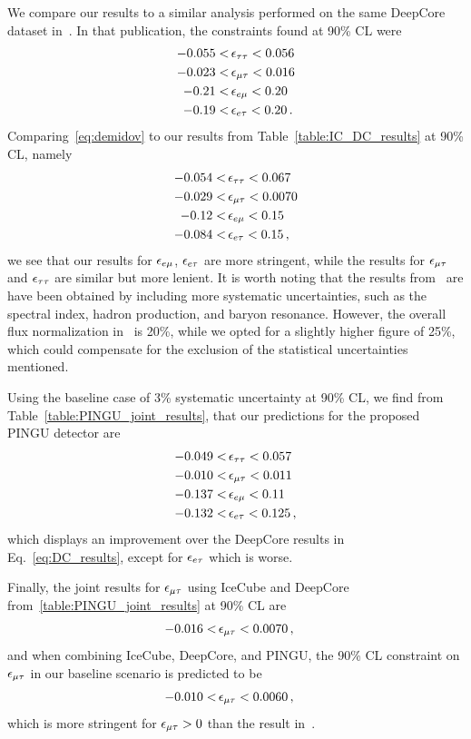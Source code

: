 {{We compare our results to a similar analysis performed on the same DeepCore dataset in~\cite{demidov}. In that publication, 
the constraints found at 90\% CL were 
\begin{align}\label{eq:demidov}
   -0.055 <&\, \epsilon_{\tau\tau} < 0.056 \nonumber \\
   -0.023 <&\, \epsilon_{\mu\tau} < 0.016 \nonumber \\
   -0.21 <&\, \epsilon_{e\mu} < 0.20 \nonumber \\
   -0.19 <&\, \epsilon_{e\tau} < 0.20\,.
\end{align}
Comparing~\ref{eq:demidov} to our results from Table~\ref{table:IC_DC_results} at 90\% CL, namely
\begin{align}\label{eq:DC_results}
   -0.054 <&\, \epsilon_{\tau\tau} < 0.067 \nonumber \\
   -0.029 <&\, \epsilon_{\mu\tau} < 0.0070 \nonumber \\
   -0.12 <&\, \epsilon_{e\mu} < 0.15 \nonumber \\
   -0.084 <&\, \epsilon_{e\tau} < 0.15\,,
\end{align}
we see that our results for $\epsilon_{e\mu}$, $\epsilon_{e\tau}$ are more stringent, while the results for $\epsilon_{\mu\tau}$ and $\epsilon_{\tau\tau}$ are similar but more lenient. It is worth noting that the 
results from~\cite{demidov} are have been obtained by including more systematic uncertainties, such as the spectral index, hadron production, and baryon resonance. 
However, the overall flux normalization in~\cite{demidov} is 20\%, while we opted for a slightly higher figure of 25\%, which could compensate for the exclusion of the 
statistical uncertainties mentioned.

Using the baseline case of 3\% systematic uncertainty at 90\% CL, we find from Table~\ref{table:PINGU_joint_results}, that our predictions for the proposed PINGU detector are
\begin{align}\label{eq:P_results}
   -0.049 <&\, \epsilon_{\tau\tau} < 0.057 \nonumber \\
   -0.010 <&\, \epsilon_{\mu\tau} < 0.011 \nonumber \\
   -0.137 <&\, \epsilon_{e\mu} < 0.11 \nonumber \\
   -0.132 <&\, \epsilon_{e\tau} < 0.125\,,
\end{align}
which displays an improvement over the DeepCore results in Eq.~\ref{eq:DC_results}, except for $\epsilon_{e\tau}$ which is worse.

Finally, the joint results for $\epsilon_{\mu\tau}$ using IceCube and DeepCore from~\ref{table:PINGU_joint_results} at 90\% CL are
\begin{align}\label{eq:ID_result}
   -0.016 <&\, \epsilon_{\mu\tau} < 0.0070\,,
\end{align}
and when combining IceCube, DeepCore, and PINGU, the 90\% CL constraint on $\epsilon_{\mu\tau}$ in our baseline scenario is predicted to be
\begin{align}\label{eq:PID_result}
   -0.010 <&\, \epsilon_{\mu\tau} < 0.0060\,,
\end{align}
which is more stringent for $\epsilon_{\mu\tau}>0$ than the result in~\cite{deepcoreNSI}.

}}
